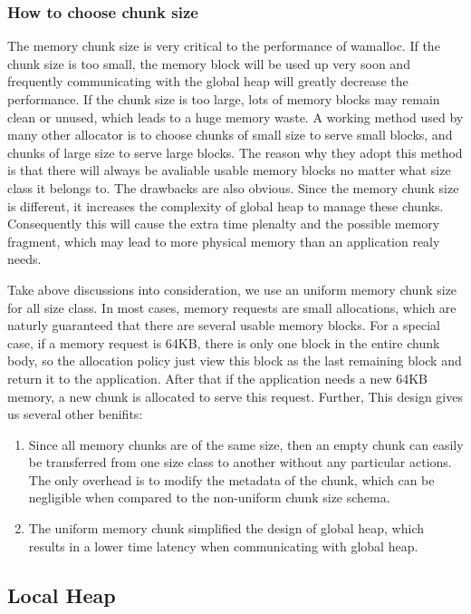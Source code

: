 \documentclass{vldb}
\begin{document}
\subsubsection{How to choose chunk size}
The memory chunk size is very critical to the performance of wamalloc. 
If the chunk size is too small, the memory block will be used up very soon and frequently communicating with the global heap will greatly decrease the performance.
If the chunk size is too large, lots of memory blocks may remain clean or unused, which leads to a huge memory waste. 
A working method used by many other allocator is to choose chunks of small size to serve small blocks, and chunks of large size to serve large blocks.
The reason why they adopt this method is that there will always be avaliable usable memory blocks no matter what size class it belongs to.
The drawbacks are also obvious.
Since the memory chunk size is different, it increases the complexity of global heap to manage these chunks.
Consequently this will cause the extra time plenalty and the possible memory fragment, which may lead to more physical memory than an application realy needs.

Take above discussions into consideration, we use an uniform memory chunk size for all size class. 
In most cases, memory requests are small allocations, which are naturly guaranteed that there are several usable memory blocks. 
For a special case, if a memory request is 64KB, there is only one block in the entire chunk body, so the allocation policy just view this block as the last remaining block and return it to the application. After that if the application needs a new 64KB memory, a new chunk is allocated to serve this request.
Further, This design gives us several other benifits: 
\begin{enumerate}
    \item Since all memory chunks are of the same size, then an empty chunk can easily be transferred from one size class to another without any particular actions.
The only overhead is to modify the metadata of the chunk, which can be negligible when compared to the non-uniform chunk size schema. 
    \item The uniform memory chunk simplified the design of global heap, which results in a lower time latency when communicating with global heap.
\end{enumerate}

\subsection{Local Heap}
\end{document}
